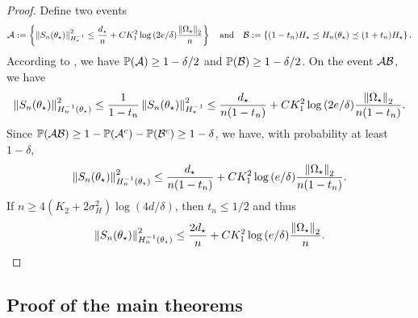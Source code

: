 \begin{proof}
    Define two events
    \begin{align*}
        \mathcal{A} := \left\{ \left\lVert S_n(\theta_\star) \right\rVert_{H_\star^{-1}}^{2} \le \frac{d_\star}{n} + C K_{1}^2 \log{(2e / \delta)} \frac{\left\lVert \Omega_\star \right\rVert_2}{n} \right\} \quad \mbox{and} \quad \mathcal{B} := \left\{ (1-t_n) H_\star \preceq H_n(\theta_\star) \preceq (1+t_n) H_\star \right\}.
    \end{align*}
    According to , we have $\operatorname{\mathbb P}(\mathcal{A}) \ge 1 - \delta/2$ and $\operatorname{\mathbb P}(\mathcal{B}) \ge 1 - \delta/2$.
    On the event $\mathcal{A} \mathcal{B}$, we have
    \begin{align*}
        \left\lVert S_n(\theta_\star) \right\rVert_{H_n^{-1}(\theta_\star)}^2
        \le \frac1{1-t_n} \left\lVert S_n(\theta_\star) \right\rVert_{H_\star^{-1}}^2
        \le \frac{d_\star}{n(1-t_n)} + C K_{1}^2 \log{(2e / \delta)} \frac{\left\lVert \Omega_\star \right\rVert_2}{n(1-t_n)}.
    \end{align*}
    Since $\operatorname{\mathbb P}(\mathcal{A} \mathcal{B}) \ge 1 - \operatorname{\mathbb P}(\mathcal{A}^c) - \operatorname{\mathbb P}(\mathcal{B}^c) \ge 1 - \delta$, we have, with probability at least $1 - \delta$,
    \begin{align*}
        \left\lVert S_n(\theta_\star) \right\rVert_{H_n^{-1}(\theta_\star)}^2 \le \frac{d_\star}{n(1-t_n)} + C K_{1}^2 \log{(e / \delta)} \frac{\left\lVert \Omega_\star \right\rVert_2}{n(1-t_n)}.
    \end{align*}
    If $n \ge 4(K_2 + 2\sigma_H^2) \log{(4d/\delta)}$, then $t_n \le 1/2$ and thus
    \begin{align*}
        \left\lVert S_n(\theta_\star) \right\rVert_{H_n^{-1}(\theta_\star)}^2 \le \frac{2d_\star}{n} + C K_{1}^2 \log{(e / \delta)} \frac{\left\lVert \Omega_\star \right\rVert_2}{n}.
    \end{align*}
\end{proof}


\subsection{Proof of the main theorems}
\label{sub:appendix:thm}

